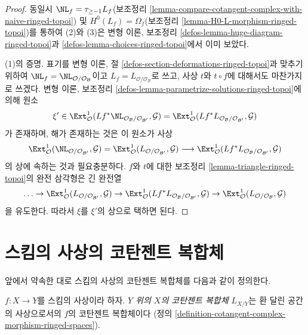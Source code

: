 \begin{proof}
동일시 $\NL_f = \tau_{\geq -1}L_f$(보조정리
\ref{lemma-compare-cotangent-complex-with-naive-ringed-topoi}) 및
$H^0(L_f) = \Omega_f$(보조정리 \ref{lemma-H0-L-morphism-ringed-topoi})를
통하여 (2)와 (3)은 변형 이론, 보조정리
\ref{defos-lemma-huge-diagram-ringed-topoi}과
\ref{defos-lemma-choices-ringed-topoi}에서 이미 보았다.

\medskip\noindent
(1)의 증명. 표기를 변형 이론, 절
\ref{defos-section-deformations-ringed-topoi}과 맞추기 위하여
$\NL_f = \NL_{\mathcal{O}/\mathcal{O}_\mathcal{B}}$이고
$L_f = L_{\mathcal{O}/\mathcal{O}_\mathcal{B}}$로 쓰고, 사상 $t$와
$t \circ f$에 대해서도 마찬가지로 쓰겠다. 변형 이론, 보조정리
\ref{defos-lemma-parametrize-solutions-ringed-topoi}에 의해 원소
$$
\xi' \in
\Ext^1_\mathcal{O}(
Lf^*\NL_{\mathcal{O}_\mathcal{B}/\mathcal{O}_{\mathcal{B}'}}, \mathcal{G}) =
\Ext^1_\mathcal{O}(
Lf^*L_{\mathcal{O}_\mathcal{B}/\mathcal{O}_{\mathcal{B}'}}, \mathcal{G})
$$
가 존재하며, 해가 존재하는 것은 이 원소가 사상
$$
\Ext^1_\mathcal{O}(
\NL_{\mathcal{O}/\mathcal{O}_{\mathcal{B}'}}, \mathcal{G}) =
\Ext^1_\mathcal{O}(
L_{\mathcal{O}/\mathcal{O}_{\mathcal{B}'}}, \mathcal{G})
\longrightarrow
\Ext^1_\mathcal{O}(
Lf^*L_{\mathcal{O}_\mathcal{B}/\mathcal{O}_{\mathcal{B}'}}, \mathcal{G})
$$
의 상에 속하는 것과 필요충분하다. $f$와 $t$에 대한 보조정리
\ref{lemma-triangle-ringed-topoi}의 완전 삼각형은 긴 완전열
$$
\ldots \to
\Ext^1_\mathcal{O}(
L_{\mathcal{O}/\mathcal{O}_{\mathcal{B}'}}, \mathcal{G}) \to
\Ext^1_\mathcal{O}(
Lf^*L_{\mathcal{O}_\mathcal{B}/\mathcal{O}_{\mathcal{B}'}}, \mathcal{G})
\to
\Ext^1_\mathcal{O}(
L_{\mathcal{O}/\mathcal{O}_\mathcal{B}}, \mathcal{G})
$$
을 유도한다. 따라서 $\xi$를 $\xi'$의 상으로 택하면 된다.
\end{proof}












\section{스킴의 사상의 코탄젠트 복합체}
\label{section-cotangent-morphism-schemes}

\noindent
앞에서 약속한 대로 스킴의 사상의 코탄젠트 복합체를 다음과 같이 정의한다.

\begin{definition}
\label{definition-cotangent-morphism-schemes}
$f : X \to Y$를 스킴의 사상이라 하자. {\it $Y$ 위의 $X$의 코탄젠트 복합체
$L_{X/Y}$}는 환 달린 공간의 사상으로서의 $f$의 코탄젠트 복합체이다
(정의 \ref{definition-cotangent-complex-morphism-ringed-spaces}).
\end{definition}

